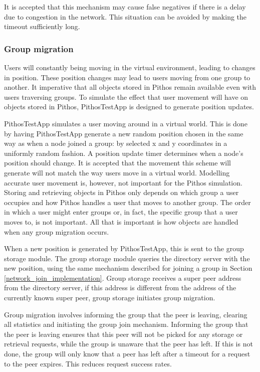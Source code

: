     It is accepted that this mechanism may cause false negatives if there is a delay due to congestion in the network. This situation can be avoided by making the timeout sufficiently long.

    \subsubsection{Group migration}
    \label{group_migration_implementation}

    Users will constantly being moving in the virtual environment, leading to changes in position. These position changes may lead to users moving from one group to another. It imperative that all objects stored in Pithos remain available even with users traversing groups. To simulate the effect that user movement will have on objects stored in Pithos, PithosTestApp is designed to generate position updates.

    PithosTestApp simulates a user moving around in a virtual world. This is done by having PithosTestApp generate a new random position chosen in the same way as when a node joined a group: by selected x and y coordinates in a uniformly random fashion. A position update timer determines when a node's position should change. It is accepted that the movement this scheme will generate will not match the way users move in a virtual world. Modelling accurate user movement is, however, not important for the Pithos simulation. Storing and retrieving objects in Pithos only depends on which group a user occupies and how Pithos handles a user that moves to another group. The order in which a user might enter groups or, in fact, the specific group that a user moves to, is not important. All that is important is how objects are handled when any group migration occurs.

    When a new position is generated by PithosTestApp, this is sent to the group storage module. The group storage module queries the directory server with the new position, using the same mechanism described for joining a group in Section \ref{network_join_implementation}. Group storage receives a super peer address from the directory server, if this address is different from the address of the currently known super peer, group storage initiates group migration.

    Group migration involves informing the group that the peer is leaving, clearing all statistics and initiating the group join mechanism. Informing the group that the peer is leaving ensures that this peer will not be picked for any storage or retrieval requests, while the group is unaware that the peer has left. If this is not done, the group will only know that a peer has left after a timeout for a request to the peer expires. This reduces request success rates.

